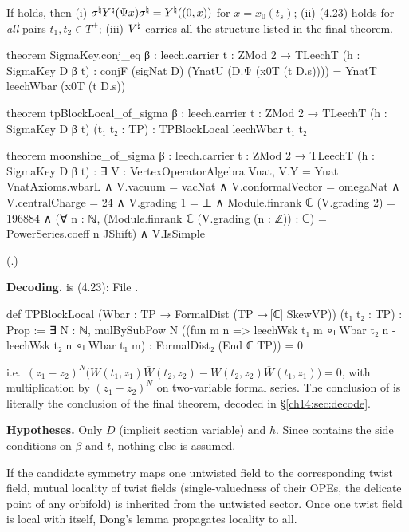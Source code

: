 \begin{theorem}\label{ch14:thm:tpblock}
If  holds, then (i) $\sigma^{\natural} Y^\natural(\Psi x)\sigma^{\natural}=Y^\natural((0,x))$ for
$x=x_0(t_s)$; (ii) (4.23) holds for \emph{all} pairs $t_1,t_2\in T^+$; (iii) ${V^{\natural}}$ carries all the
structure listed in the final theorem.
\end{theorem}
\begin{leancode}
theorem SigmaKey.conj_eq {β : leech.carrier} {t : ZMod 2 → TLeechT} (h : SigmaKey D β t) :
    conjF (sigNat D) (YnatU (D.Ψ (x0T (t D.s)))) = YnatT leechWbar (x0T (t D.s))

theorem tpBlockLocal_of_sigma {β : leech.carrier} {t : ZMod 2 → TLeechT} (h : SigmaKey D β t)
    (t₁ t₂ : TP) : TPBlockLocal leechWbar t₁ t₂

theorem moonshine_of_sigma {β : leech.carrier} {t : ZMod 2 → TLeechT} (h : SigmaKey D β t) :
    ∃ V : VertexOperatorAlgebra Vnat,
      V.Y = Ynat VnatAxioms.wbarL ∧ V.vacuum = vacNat ∧ V.conformalVector = omegaNat ∧
      V.centralCharge = 24 ∧
      V.grading 1 = ⊥ ∧
      Module.finrank ℂ (V.grading 2) = 196884 ∧
      (∀ n : ℕ, (Module.finrank ℂ (V.grading (n : ℤ)) : ℂ) = PowerSeries.coeff n JShift) ∧
      V.IsSimple
\end{leancode}
(.)

\begin{dictionary}
\textbf{Decoding.}   is (4.23):
\noindent File .
\begin{leancode}
def TPBlockLocal (Wbar : TP → FormalDist (TP →ₗ[ℂ] SkewVP)) (t₁ t₂ : TP) : Prop :=
  ∃ N : ℕ, mulBySubPow N
    ((fun m n => leechWsk t₁ m ∘ₗ Wbar t₂ n - leechWsk t₂ n ∘ₗ Wbar t₁ m) :
      FormalDist₂ (End ℂ TP)) = 0
\end{leancode}
i.e.\ $(z_1-z_2)^N\bigl(W(t_1,z_1)\overline W(t_2,z_2)-W(t_2,z_2)\overline W(t_1,z_1)\bigr)=0$, with
 multiplication by $(z_1-z_2)^N$ on two-variable formal series.  The conclusion of
 is literally the conclusion of the final theorem, decoded in
\S\ref{ch14:sec:decode}.

\textbf{Hypotheses.}  Only $D$ (implicit section variable) and $h$.  Since  contains the side
conditions on $\beta$ and $t$, nothing else is assumed.
\end{dictionary}
\begin{physics}
If the candidate symmetry maps one untwisted field to the corresponding twist field, mutual locality of twist fields (single-valuedness of their OPEs, the delicate point of any orbifold) is inherited from the untwisted sector. Once one twist field is local with itself, Dong's lemma propagates locality to all.
\end{physics}


